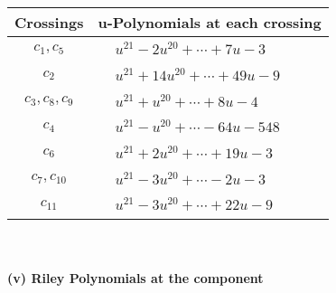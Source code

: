 \documentclass[1p]{elsarticle_modified}
\theoremstyle{definition}
\begin{document}
\begin{tabular}{m{50pt}|m{274pt}}
Crossings & \hspace{64pt}u-Polynomials at each crossing \\
\hline $$\begin{aligned}c_{1},c_{5}\end{aligned}$$&$\begin{aligned}
&u^{21}-2 u^{20}+\cdots+7 u-3
\end{aligned}$\\
\hline $$\begin{aligned}c_{2}\end{aligned}$$&$\begin{aligned}
&u^{21}+14 u^{20}+\cdots+49 u-9
\end{aligned}$\\
\hline $$\begin{aligned}c_{3},c_{8},c_{9}\end{aligned}$$&$\begin{aligned}
&u^{21}+u^{20}+\cdots+8 u-4
\end{aligned}$\\
\hline $$\begin{aligned}c_{4}\end{aligned}$$&$\begin{aligned}
&u^{21}- u^{20}+\cdots-64 u-548
\end{aligned}$\\
\hline $$\begin{aligned}c_{6}\end{aligned}$$&$\begin{aligned}
&u^{21}+2 u^{20}+\cdots+19 u-3
\end{aligned}$\\
\hline $$\begin{aligned}c_{7},c_{10}\end{aligned}$$&$\begin{aligned}
&u^{21}-3 u^{20}+\cdots-2 u-3
\end{aligned}$\\
\hline $$\begin{aligned}c_{11}\end{aligned}$$&$\begin{aligned}
&u^{21}-3 u^{20}+\cdots+22 u-9
\end{aligned}$\\
\hline
\end{tabular}\\~\\
\newpage\renewcommand{\arraystretch}{1}
\flushleft \textbf{(v) Riley Polynomials at the component}\newline \\
\end{document}
